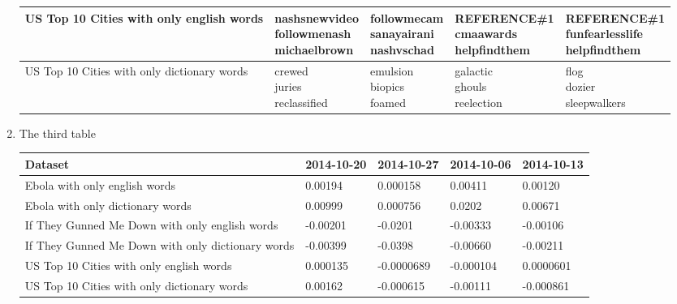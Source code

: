 \documentclass[11pt, oneside]{article}
\makeatletter
\newcommand{\specialcell}[2][c]{%
  \begin{tabular}[#1]{@{}c@{}}#2\end{tabular}}
\makeatother
\begin{document}
\begin{enumerate}
\begin{tabularx}{\textwidth}{X|l|l|l|l}
\hline US Top 10 Cities with only english words & 
\specialcell{nashsnewvideo\\followmenash\\michaelbrown} & 
\specialcell{followmecam\\sanayairani\\nashvschad} & 
\specialcell{REFERENCE\#1\\cmaawards\\helpfindthem} & 
\specialcell{REFERENCE\#1\\funfearlesslife\\helpfindthem} \\ 
\hline US Top 10 Cities with only dictionary words & 
\specialcell{crewed\\juries\\reclassified} & 
\specialcell{emulsion\\biopics\\foamed} & 
\specialcell{galactic\\ghouls\\reelection} & 
\specialcell{flog\\dozier\\sleepwalkers} \\ 
\hline \end{tabularx}

\par

\item The third table

\begin{tabularx}{\textwidth}{X|l|l|l|l}
\textbf{Dataset} & \textbf{2014-10-20} & \textbf{2014-10-27} & \textbf{2014-10-06} & \textbf{2014-10-13} \\
\hline Ebola with only english words & 0.00194 & 0.000158 & 0.00411 & 0.00120 \\ 
\hline Ebola with only dictionary words & 0.00999 & 0.000756 & 0.0202 & 0.00671 \\ 
\hline If They Gunned Me Down with only english words & -0.00201 & -0.0201 & -0.00333 & -0.00106 \\ 
\hline If They Gunned Me Down with only dictionary words & -0.00399 & -0.0398 & -0.00660 & -0.00211 \\ 
\hline US Top 10 Cities with only english words & 0.000135 & -0.0000689 & -0.000104 & 0.0000601 \\ 
\hline US Top 10 Cities with only dictionary words & 0.00162 & -0.000615 & -0.00111 & -0.000861 \\ 
\hline \end{tabularx}

\end{enumerate}
\end{document}
